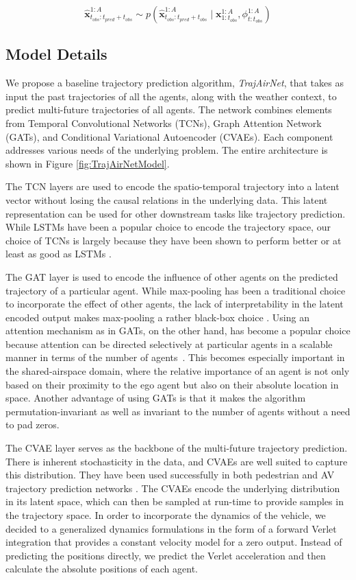 \documentclass[letterpaper, 10 pt, conference]{ieeeconf}
\begin{document}
\begin{equation}
    \mathbf{\hat{x}}^{1:A}_{t_{obs}:t_{pred}+t_{obs}} \sim p( \mathbf{\hat{x}}^{1:A}_{t_{obs}:t_{pred}+t_{obs}} \mid \mathbf{{x}}^{1:A}_{1:t_{obs}}, \phi^{1:A}_{t:t_{obs}})
\end{equation}   
\subsection{Model Details}\label{sec:model}
We propose a baseline trajectory prediction algorithm, \textit{TrajAirNet}, that takes as input the past trajectories of all the agents, along with the weather context, to predict multi-future trajectories of all agents. The network combines elements from Temporal Convolutional Networks (TCNs), Graph Attention Network (GATs), and Conditional Variational Autoencoder (CVAEs). Each component addresses various needs of the underlying problem. The entire architecture is shown in Figure \ref{fig:TrajAirNetModel}.  

The TCN layers are used to encode the spatio-temporal trajectory into a latent vector without losing the causal relations in the underlying data. This latent representation can be used for other downstream tasks like trajectory prediction. While LSTMs have been a popular choice to encode the trajectory space, our choice of TCNs is largely because they have been shown to perform better or at least as good as LSTMs \cite{bai2018empirical}.

The GAT layer is used to encode the influence of other agents on the predicted trajectory of a particular agent. While max-pooling has been a traditional choice to incorporate the effect of other agents, the lack of interpretability in the latent encoded output makes max-pooling a rather black-box choice \cite{zhao2020noticing}. Using an attention mechanism as in GATs, on the other hand, has become a popular choice because attention can be directed selectively at particular agents in a scalable manner in terms of the number of agents~\cite{vemula2018}. This becomes especially important in the shared-airspace domain, where the relative importance of an agent is not only based on their proximity to the ego agent but also on their absolute location in space. Another advantage of using GATs is that it makes the algorithm permutation-invariant as well as invariant to the number of agents without a need to pad zeros. 

The CVAE layer serves as the backbone of the multi-future trajectory prediction. There is inherent stochasticity in the data, and CVAEs are well suited to capture this distribution. They have been used successfully in both pedestrian and AV trajectory prediction networks \cite{salzmann2020trajectron++}. The CVAEs encode the underlying distribution in its latent space, which can then be sampled at run-time to provide samples in the trajectory space. In order to incorporate the dynamics of the vehicle, we decided to a generalized dynamics formulations in the form of a forward Verlet integration \cite{rhinehart2019precog} that provides a constant velocity model for a zero output. Instead of predicting the positions directly, we predict the Verlet acceleration and then calculate the absolute positions of each agent. 
\end{document}
